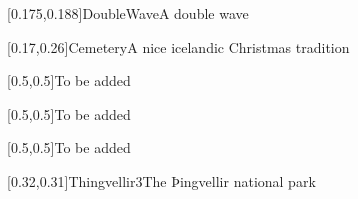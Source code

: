 



\graphicspath{{Figures/}{Figures/Iceland/}}


\subtitle{Day 5}
\date{30.10.2020}


    
    [0.175,0.188]{DoubleWave}{A double wave}
    
    
    [0.17,0.26]{Cemetery}{A nice icelandic Christmas tradition}
    
    [0.5,0.5]{}{To be added}
    
    [0.5,0.5]{}{To be added}
    
    [0.5,0.5]{}{To be added}
    
    [0.32,0.31]{Thingvellir3}{The Þingvellir national park}
    

